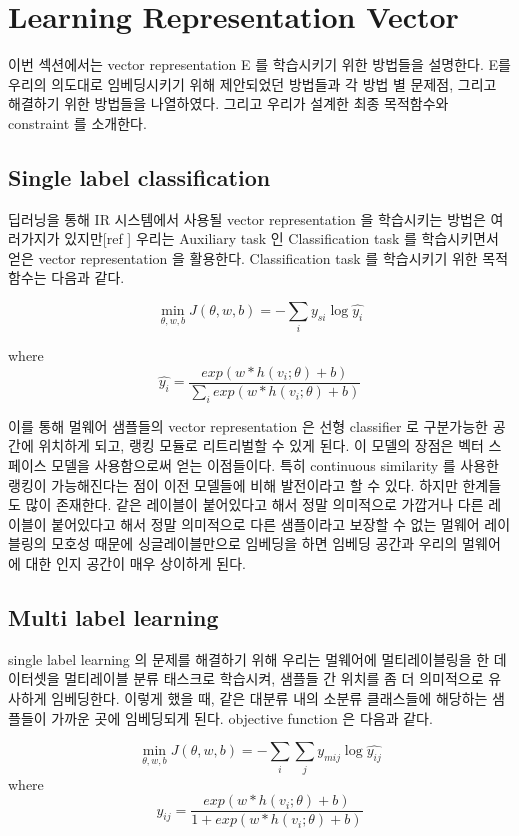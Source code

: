 \section{Learning Representation Vector}
이번 섹션에서는 vector representation E 를 학습시키기 위한 방법들을 설명한다. E를 우리의 의도대로 임베딩시키기 위해 제안되었던 방법들과 각 방법 별 문제점, 그리고 해결하기 위한 방법들을 나열하였다. 그리고 우리가 설계한 최종 목적함수와 constraint 를 소개한다. 


\subsection{Single label classification}
 딥러닝을 통해 IR 시스템에서 사용될 vector representation 을 학습시키는 방법은 여러가지가 있지만[ref ] 우리는 Auxiliary task 인 Classification task 를 학습시키면서 얻은 vector representation 을 활용한다. Classification task 를 학습시키기 위한 목적함수는 다음과 같다.

\begin{equation}
\label{eqn:01}
\min_{\theta,w,b} J(\theta, w, b) = -\sum_i{y_{si} \log{\hat{y_i}}}
\end{equation}

where 
\[
\hat{y_i} = \frac{exp(w*h(v_i;\theta)+b)}{\sum_i{exp(w*h(v_i;\theta)+b)}}
\]

 이를 통해 멀웨어 샘플들의 vector representation 은 선형 classifier 로 구분가능한 공간에 위치하게 되고, 랭킹 모듈로 리트리벌할 수 있게 된다. 이 모델의 장점은 벡터 스페이스 모델을 사용함으로써 얻는 이점들이다. 특히 continuous similarity 를 사용한 랭킹이 가능해진다는 점이 이전 모델들에 비해 발전이라고 할 수 있다. 하지만 한계들도 많이 존재한다. 같은 레이블이 붙어있다고 해서 정말 의미적으로 가깝거나 다른 레이블이 붙어있다고 해서 정말 의미적으로 다른 샘플이라고 보장할 수 없는 멀웨어 레이블링의 모호성 때문에 싱글레이블만으로 임베딩을 하면 임베딩 공간과 우리의 멀웨어에 대한 인지 공간이 매우 상이하게 된다. 


\subsection{Multi label learning}
single label learning 의 문제를 해결하기 위해 우리는 멀웨어에 멀티레이블링을 한 데이터셋을 멀티레이블 분류 태스크로 학습시켜, 샘플들 간 위치를 좀 더 의미적으로 유사하게 임베딩한다. 이렇게 했을 때, 같은 대분류 내의 소분류 클래스들에 해당하는 샘플들이 가까운 곳에 임베딩되게 된다. objective function 은 다음과 같다. 

\begin{equation}
\label{eqn:02}
\min_{\theta,w,b} J(\theta, w, b) = -\sum_i{ \sum_j{ y_{mij} \log{\hat{y_{ij}}}}}
\end{equation}
where  
\[
\hat{y_{ij}} = \frac{exp(w*h(v_i;\theta)+b)}{ 1 + exp(w*h(v_i;\theta)+b)}
\]

